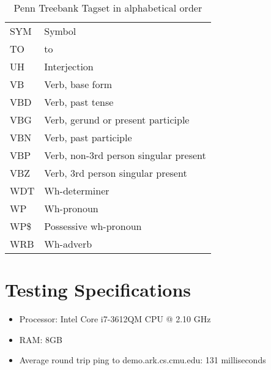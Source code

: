 \begin{table}[!htbp]
\begin{tabular}{|l|l|}
    SYM  & Symbol                                   \\
    TO   & to                                       \\
    UH   & Interjection                             \\
    VB   & Verb, base form                          \\
    VBD  & Verb, past tense                         \\
    VBG  & Verb, gerund or present participle       \\
    VBN  & Verb, past participle                    \\
    VBP  & Verb, non-3rd person singular present    \\
    VBZ  & Verb, 3rd person singular present        \\
    WDT  & Wh-determiner                            \\
    WP   & Wh-pronoun                               \\
    WP\$ & Possessive wh-pronoun                    \\
    WRB  & Wh-adverb                                \\ \hline
    \end{tabular}
    \caption{Penn Treebank Tagset in alphabetical order}
\end{table}

\section{Testing Specifications}
\label{sec:specs}
\begin{itemize}
\item{Processor: Intel Core i7-3612QM CPU @ 2.10 GHz}
\item{RAM: 8GB}
\item{Average round trip ping to demo.ark.cs.cmu.edu: 131 milliseconds}
\end{itemize}

